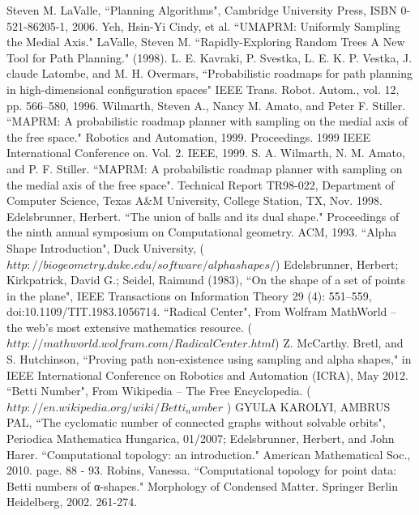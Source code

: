 \documentclass[11pt]{article}
\begin{document}
\begin{thebibliography}{1}
   Steven M. LaValle, ``Planning Algorithms", Cambridge University Press, ISBN 0-521-86205-1, 2006.
   Yeh, Hsin-Yi Cindy, et al. ``UMAPRM: Uniformly Sampling the Medial Axis."
   LaValle, Steven M. ``Rapidly-Exploring Random Trees A New Tool for Path Planning." (1998).
   L. E. Kavraki, P. Svestka, L. E. K. P. Vestka, J. claude Latombe, and M. H. Overmars, ``Probabilistic roadmaps for path planning in high-dimensional configuration spaces" IEEE Trans. Robot. Autom., vol. 12, pp. 566–580, 1996.
   Wilmarth, Steven A., Nancy M. Amato, and Peter F. Stiller. ``MAPRM: A probabilistic roadmap planner with sampling on the medial axis of the free space." Robotics and Automation, 1999. Proceedings. 1999 IEEE International Conference on. Vol. 2. IEEE, 1999.
   S. A. Wilmarth, N. M. Amato, and P. F. Stiller. ``MAPRM: A probabilistic roadmap planner with sampling on the medial axis of the free space". Technical Report TR98-022, Department of Computer Science, Texas A\&M University, College Station, TX, Nov. 1998.
   Edelsbrunner, Herbert. ``The union of balls and its dual shape." Proceedings of the ninth annual symposium on Computational geometry. ACM, 1993.
   ``Alpha Shape Introduction", Duck University, ($http://biogeometry.duke.edu/software/alphashapes/$)
   Edelsbrunner, Herbert; Kirkpatrick, David G.; Seidel, Raimund (1983), ``On the shape of a set of points in the plane", IEEE Transactions on Information Theory 29 (4): 551–559, doi:10.1109/TIT.1983.1056714.
   ``Radical Center", From Wolfram MathWorld -- the web's most extensive mathematics resource. ($http://mathworld.wolfram.com/RadicalCenter.html$)
   Z. McCarthy. Bretl, and S. Hutchinson, ``Proving path non-existence using sampling and alpha shapes," in IEEE International Conference on Robotics and Automation (ICRA), May 2012.
   ``Betti Number", From Wikipedia -- The Free Encyclopedia. ( $http://en.wikipedia.org/wiki/Betti_number$ )   
   GYULA KAROLYI, AMBRUS PAL, ``The cyclomatic number of connected graphs without solvable orbits", Periodica Mathematica Hungarica, 01/2007; 
  Edelsbrunner, Herbert, and John Harer. ``Computational topology: an introduction." American Mathematical Soc., 2010. page. 88 - 93.
   Robins, Vanessa. ``Computational topology for point data: Betti numbers of α-shapes." Morphology of Condensed Matter. Springer Berlin Heidelberg, 2002. 261-274.
\end{thebibliography}
\end{document}
